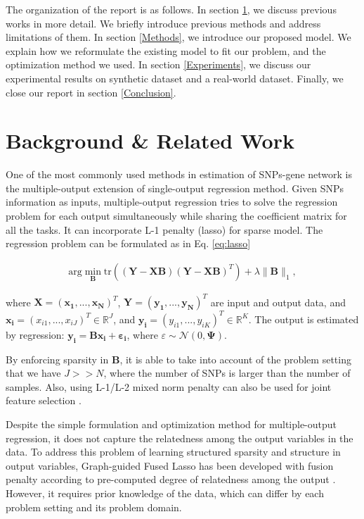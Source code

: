 \documentclass{article}
\begin{document}
The organization of the report is as follows. In section \ref{LiteratureReview}, we discuss previous works in more detail. We briefly introduce previous methods and address limitations of them. In section \ref{Methods}, we introduce our proposed model. We explain how we reformulate the existing model to fit our problem, and the optimization method we used. In section \ref{Experiments}, we discuss our experimental results on synthetic dataset and a real-world dataset. Finally, we close our report in section \ref{Conclusion}.



\section{Background \& Related Work}
\label{LiteratureReview}

One of the most commonly used methods in estimation of SNPs-gene network is the multiple-output extension of single-output regression method. Given SNPs information as inputs, multiple-output regression tries to solve the regression problem for each output simultaneously while sharing the coefficient matrix for all the tasks. It can incorporate L-1 penalty (lasso) \cite{tibshirani1996regression} for sparse model. The regression problem can be formulated as in Eq. \ref{eq:lasso}

\begin{align}\label{eq:lasso}
\text{arg} \min_{\textbf{B}} \text{tr}((\mathbf{Y}-\mathbf{XB})(\mathbf{Y}-\mathbf{XB})^T) + \lambda \| \mathbf{B}\|_1,
\end{align}

where $\mathbf{X}=(\mathbf{x_1}, ... ,\mathbf{x_N})^T$, $\mathbf{Y}=(\mathbf{y_1}, ... ,\mathbf{y_N})^T$ are input and output data, and $\mathbf{x_i}=(x_{i1}, ... ,x_{iJ})^T \in \mathbb{R}^J$, and $\mathbf{y_i}=(y_{i1}, ... ,y_{iK})^T \in \mathbb{R}^K$.
The output is estimated by regression: $\mathbf{y_i}=\mathbf{Bx_i}+\mathbf{\varepsilon_i}$, where $\varepsilon  \sim \mathcal{N}(0, \mathbf{\Psi})$.

By enforcing sparsity in \textbf{B}, it is able to take into account of the problem setting that we have $J >> N$, where the number of SNPs is larger than the number of samples. Also, using L-1/L-2 mixed norm penalty can also be used for joint feature selection \cite{obozinski2008high}.



Despite the simple formulation and optimization method for multiple-output regression, it does not capture the relatedness among the output variables in the data. To address this problem of learning structured sparsity and structure in output variables, Graph-guided Fused Lasso has been developed with fusion penalty according to pre-computed degree of relatedness among the output \cite{kim2009statistical}. However, it requires prior knowledge of the data, which can differ by each problem setting and its problem domain. 
\end{document}
